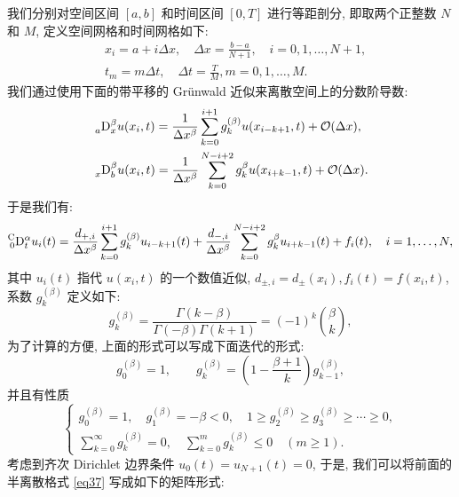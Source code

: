 \documentclass{ecnumaster}
\begin{document}
我们分别对空间区间 $[a, b]$ 和时间区间 $[0, T]$ 进行等距剖分,
即取两个正整数 $N$ 和 $M$, 定义空间网格和时间网格如下:
\begin{align*}
  &x_i = a + i\Delta x, \quad \Delta x = \frac{b - a}{N + 1},\quad i = 0, 1, \dots , N + 1,\\
  &t_m = m\Delta t, \quad \Delta t = \frac{T}{M}, m = 0, 1, \dots ,M.
\end{align*}
我们通过使用下面的带平移的 Gr\"unwald 近似来离散空间上的分数阶导数\cite{MT04, MT06}:
\begin{equation}
  \begin{split}
  &\prescript{}{a}{\mathrm{D}}_x^{\beta}u(x_i, t) =
  \frac{1}{\Delta x^{\beta}}\sum_{k=0}^{i + 1} g_k^{(\beta)}u(x_{i-k+1}, t) + \mathcal{O}(\Delta x),\\
  &\prescript{}{x}{\mathrm{D}}_b^{\beta}u(x_i, t) =
  \frac{1}{\Delta x^{\beta}}\sum_{k=0}^{N-i+2}g_k^{\beta}u(x_{i+k-1}, t) + \mathcal{O}(\Delta x).
  \end{split}
\end{equation}
于是我们有:
\begin{equation}\label{eq37}
  \prescript{\mathrm{C}}{0}{\mathrm{D}}_t^{\alpha}u_i(t) =
  \frac{{{d}}_{+, i}}{\Delta x^{\beta}}\sum_{k=0}^{i + 1}
  g_k^{(\beta)}u_{i-k+1} (t) + \frac{{{d}}_{-,i}}{\Delta x^{\beta}}\sum_{k=0}^{N-i+2}
  g_k^{\beta}u_{i+k-1} (t) + f_i(t), \quad i = 1, \dots, N,
\end{equation}
其中 $u_i(t)$ 指代 $u(x_i, t)$ 的一个数值近似,
$d_{\pm, i}= d_{\pm}(x_i), f_i(t) = f(x_i, t)$,
系数 $g_k^{(\beta)}$ 定义如下:
\begin{equation}\label{eq38}
g_k^{(\beta)} = \frac{\Gamma(k - \beta)}{\Gamma(-\beta)\Gamma(k + 1)}
= (-1)^k {\beta \choose k},
\end{equation}
为了计算的方便, 上面的形式可以写成下面迭代的形式\cite{P99}:
$$
g_0^{(\beta)} = 1, \qquad g_k^{(\beta)} = \left(1 - \frac{\beta + 1}{k}\right)g_{k-1}^{(\beta)},
$$
并且有性质
\begin{equation}\label{eq310}
  \begin{cases}
    g_0^{(\beta)} = 1, \quad g_1^{(\beta)} = -\beta < 0, \quad 1 \ge g_2^{(\beta)} \ge g_3^{(\beta)} \ge \cdots \ge 0,\\
    \sum\limits_{k=0}^{\infty} g_k^{(\beta)} = 0, \quad \sum\limits _{k=0}^{m} g_k^{(\beta)} \leq 0 \quad (m \ge 1).
  \end{cases}
\end{equation}
考虑到齐次 Dirichlet 边界条件 $u_0(t) = u_{N+1}(t) = 0$,
于是, 我们可以将前面的半离散格式 \eqref{eq37} 写成如下的矩阵形式:
\end{document}
